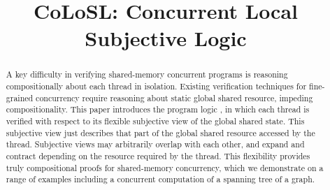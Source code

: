\documentclass[preprint]{sigplanconf}
\begin{document}
\setlength{\pdfpageheight}{\paperheight}
\setlength{\pdfpagewidth}{\paperwidth}






\title{CoLoSL: Concurrent Local Subjective Logic}
\subtitle{}

\authorinfo\null\null{\vspace{-5cm}\null}

\maketitle

\begin{abstract}
A key difficulty in verifying shared-memory concurrent programs is
reasoning compositionally about each thread in isolation. Existing
verification techniques for fine-grained concurrency require 
reasoning about static global shared resource, impeding compositionality.  This
paper introduces the program logic \colosl, in which each thread is
verified with respect to its flexible subjective view of the global
shared state.
This subjective view  just describes  that part of the global shared resource accessed by the
thread. Subjective views may arbitrarily overlap with each other, and
expand and contract depending on the resource required by the thread.
This flexibility provides truly compositional proofs for shared-memory
concurrency, which we demonstrate on a range of examples including a
concurrent computation of a spanning tree of a graph.
\end{abstract}
\end{document}
